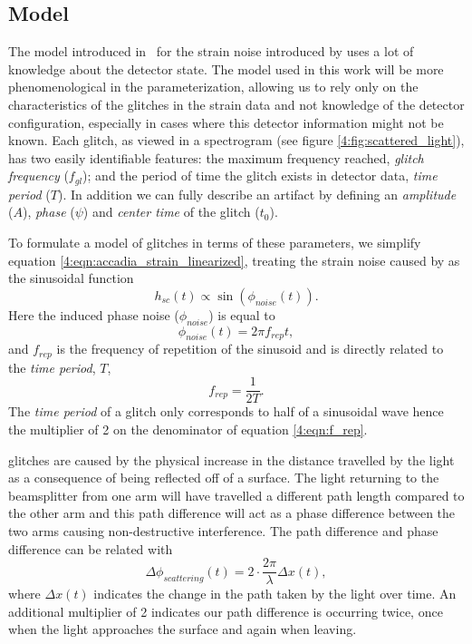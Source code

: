 \subsection{Model}

The model introduced in~\cite{TAccadia:2010} for the \gw{} strain noise introduced by \scl{} uses a lot of knowledge about the detector state. The model used in this work will be more phenomenological in the parameterization, allowing us to rely only on the characteristics of the glitches in the strain data and not knowledge of the detector configuration, especially in cases where this detector information might not be known. Each \scl{} glitch, as viewed in a spectrogram (see figure \ref{4:fig:scattered_light}), has two easily identifiable features: the maximum frequency reached, \emph{glitch frequency} ($f_{gl}$); and the period of time the glitch exists in detector data, \emph{time period} ($T$).  In addition we can fully describe an artifact by defining an \emph{amplitude} ($A$), \emph{phase} ($\psi$) and \emph{center time} of the glitch ($t_0$).

To formulate a model of \scl{} glitches in terms of these parameters, we simplify equation \ref{4:eqn:accadia_strain_linearized}, treating the strain noise caused by \scl{} as the sinusoidal function
%
\begin{equation}
  h_{sc}(t) \propto \sin(\phi_{noise}(t)).
  \label{4:eqn:h_sc_initial}
\end{equation}
%
Here the induced phase noise ($\phi_{noise}$) is equal to 
%
\begin{equation}
    \phi_{noise}(t) = 2 \pi f_{rep} t,
     \label{4:eqn:phi_noise}
\end{equation}
%
and $f_{rep}$ is the frequency of repetition of the sinusoid and is directly related to the \emph{time period}, $T$,
%
\begin{equation}
  f_{rep} = \frac{1}{2 T}.
  \label{4:eqn:f_rep}
\end{equation}
%
The \emph{time period} of a \scl{} glitch only corresponds to half of a sinusoidal wave hence the multiplier of 2 on the denominator of equation \ref{4:eqn:f_rep}.

\Scl{} glitches are caused by the physical increase in the distance travelled by the light as a consequence of being reflected off of a surface. The light returning to the beamsplitter from one arm will have travelled a different path length compared to the other arm and this path difference will act as a phase difference between the two arms causing non-destructive interference. The path difference and phase difference can be related with
%
\begin{equation}
  \Delta \phi_{scattering}(t) = 2 \cdot \frac{2 \pi}{\lambda} \Delta x(t),
  \label{4:eqn:delta_phi_scat}
\end{equation}
%
where $\Delta x(t)$ indicates the change in the path taken by the light over time. An additional multiplier of 2 indicates our path difference is occurring twice, once when the light approaches the surface and again when leaving.

